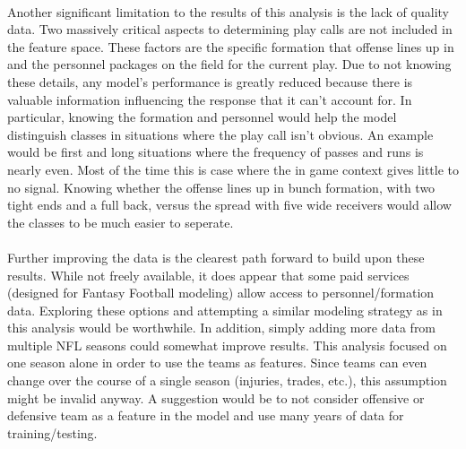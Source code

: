 \documentclass[11pt]{article}
\begin{document}
\begin{multicols*}{2}
        \paragraph{}
            Another significant limitation to the results of this analysis is the lack of quality data.
            Two massively critical aspects to determining play calls are not included in the feature space.
            These factors are the specific formation that offense lines up in and the personnel packages on the field for the current play. 
            Due to not knowing these details, any model's performance is greatly reduced because there is valuable information influencing the response that it can't account for. 
            In particular, knowing the formation and personnel would help the model distinguish classes in situations where the play call isn't obvious. 
            An example would be first and long situations where the frequency of passes and runs is nearly even. 
            Most of the time this is case where the in game context gives little to no signal. 
            Knowing whether the offense lines up in bunch formation, with two tight ends and a full back, versus the spread with five wide receivers would allow the classes to be much easier to seperate.

        \vspace{-10pt}
        \paragraph{}
            Further improving the data is the clearest path forward to build upon these results. 
            While not freely available, it does appear that some paid services (designed for Fantasy Football modeling) allow access to personnel/formation data.
            Exploring these options and attempting a similar modeling strategy as in this analysis would be worthwhile.
            In addition, simply adding more data from multiple NFL seasons could somewhat improve results. 
            This analysis focused on one season alone in order to use the teams as features. 
            Since teams can even change over the course of a single season (injuries, trades, etc.), this assumption might be invalid anyway.
            A suggestion would be to not consider offensive or defensive team as a feature in the model and use many years of data for training/testing.  


\newpage
\end{multicols*}
\end{document}
